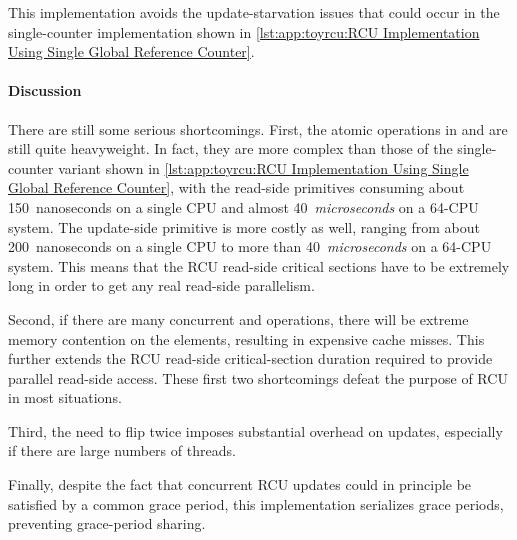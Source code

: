 This implementation avoids the update-starvation issues that could
occur in the single-counter implementation shown in
\cref{lst:app:toyrcu:RCU Implementation Using Single Global Reference Counter}.

\paragraph{Discussion}

There are still some serious shortcomings.
First, the atomic operations in 
and 
are still quite heavyweight.
In fact, they are more complex than those
of the single-counter variant shown in
\cref{lst:app:toyrcu:RCU Implementation Using Single Global Reference Counter},
with the read-side primitives consuming about 150~nanoseconds on a single
 CPU and almost 40~\emph{microseconds} on a 64-CPU system.
The update-side  primitive is more costly as
well, ranging from about 200~nanoseconds on a single  CPU to
more than 40~\emph{microseconds} on a 64-CPU system.
This means that the RCU read-side critical sections
have to be extremely long in order to get any real
read-side parallelism.

Second, if there are many concurrent 
and  operations, there will
be extreme memory contention on the 
elements, resulting in expensive cache misses.
This further extends the RCU read-side critical-section
duration required to provide parallel read-side access.
These first two shortcomings defeat the purpose of RCU in most
situations.

Third, the need to flip  twice imposes substantial
overhead on updates, especially if there are large
numbers of threads.

Finally, despite the fact that concurrent RCU updates could in principle be
satisfied by a common grace period, this implementation
serializes grace periods, preventing grace-period
sharing.

\QuickQuizEnd

